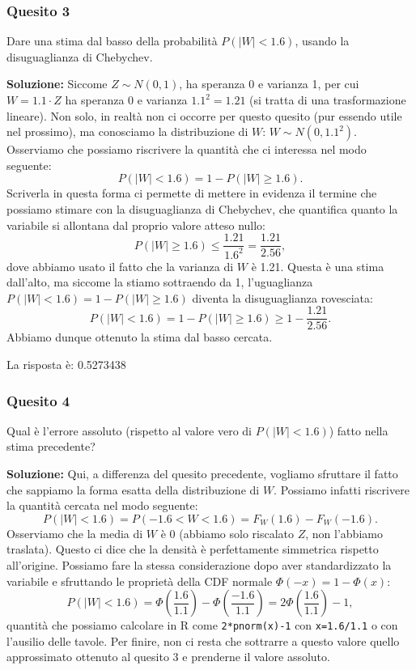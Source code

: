 \documentclass[12pt, a4paper]{article}
\begin{document}
\subsubsection*{Quesito 3}
Dare una stima dal basso della probabilità $P(|W| < 1.6)$, usando la disuguaglianza di Chebychev.

\textbf{Soluzione:}
Siccome $Z \sim N(0,1)$, ha speranza 0 e varianza 1, per cui $W = 1.1 \cdot Z$ ha speranza 0 e varianza $1.1^2 = 1.21$ (si tratta di una trasformazione lineare).
Non solo, in realtà non ci occorre per questo quesito (pur essendo utile nel prossimo), ma conosciamo la distribuzione di $W$: $W \sim N(0, 1.1^2)$.
Osserviamo che possiamo riscrivere la quantità che ci interessa nel modo seguente:
$$ P(|W| < 1.6) = 1 - P(|W| \geq 1.6). $$
Scriverla in questa forma ci permette di mettere in evidenza il termine che possiamo stimare con la disuguaglianza di Chebychev, che quantifica quanto la variabile si allontana dal proprio valore atteso nullo:
$$ P(|W| \geq 1.6) \leq \frac{1.21}{1.6^2} = \frac{1.21}{2.56}, $$
dove abbiamo usato il fatto che la varianza di $W$ è 1.21.
Questa è una stima dall’alto, ma siccome la stiamo sottraendo da 1, l’uguaglianza $P(|W| < 1.6) = 1 - P(|W| \geq 1.6)$ diventa la disuguaglianza rovesciata:
$$ P(|W| < 1.6) = 1 - P(|W| \geq 1.6) \geq 1 - \frac{1.21}{2.56}. $$
Abbiamo dunque ottenuto la stima dal basso cercata.

La risposta è: 0.5273438

\subsubsection*{Quesito 4}
Qual è l’errore assoluto (rispetto al valore vero di $P(|W| < 1.6)$) fatto nella stima precedente?

\textbf{Soluzione:}
Qui, a differenza del quesito precedente, vogliamo sfruttare il fatto che sappiamo la forma esatta della distribuzione di $W$. Possiamo infatti riscrivere la quantità cercata nel modo seguente:
$$ P(|W| < 1.6) = P(-1.6 < W < 1.6) = F_W(1.6) - F_W(-1.6). $$
Osserviamo che la media di $W$ è 0 (abbiamo solo riscalato $Z$, non l’abbiamo traslata). Questo ci dice che la densità è perfettamente simmetrica rispetto all'origine. Possiamo fare la stessa considerazione dopo aver standardizzato la variabile e sfruttando le proprietà della CDF normale $\Phi(-x) = 1 - \Phi(x)$:
$$ P(|W| < 1.6) = \Phi\left(\frac{1.6}{1.1}\right) - \Phi\left(\frac{-1.6}{1.1}\right) = 2\Phi\left(\frac{1.6}{1.1}\right) - 1, $$
quantità che possiamo calcolare in R come \texttt{2*pnorm(x)-1} con \texttt{x=1.6/1.1} o con l’ausilio delle tavole.
Per finire, non ci resta che sottrarre a questo valore quello approssimato ottenuto al quesito 3 e prenderne il valore assoluto.
\end{document}
